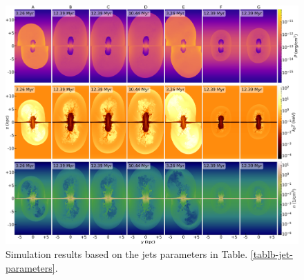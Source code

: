 \documentclass[fleqn,usenatbib,useAMS]{mnras}
\begin{document}
\begin{figure}
  \includegraphics[width=\textwidth]{figures/fig__slice-compare.png}
  \caption
   {
    Simulation results based on the jets parameters in Table. \ref{tablb-jet-parameters}.
   }
  \label{fig__slice-compare}
\end{figure}


\end{document}
